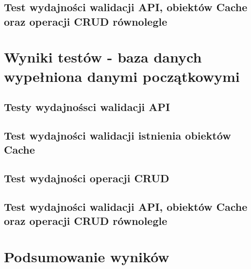 \subsection{Test wydajności walidacji API, obiektów Cache oraz operacji CRUD równolegle}
% 
% 
\clearpage

\newpage
\section{Wyniki testów - baza danych wypełniona danymi początkowymi}
\subsection{Testy wydajnośsci walidacji API}
% 
% 
\clearpage

\subsection{Test wydajności walidacji istnienia obiektów Cache}
% 
% 
\clearpage

\subsection{Test wydajności operacji CRUD}
% 
% 
\clearpage

\subsection{Test wydajności walidacji API, obiektów Cache oraz operacji CRUD równolegle }
% 
% 
\clearpage

\newpage
\section{Podsumowanie wyników}
